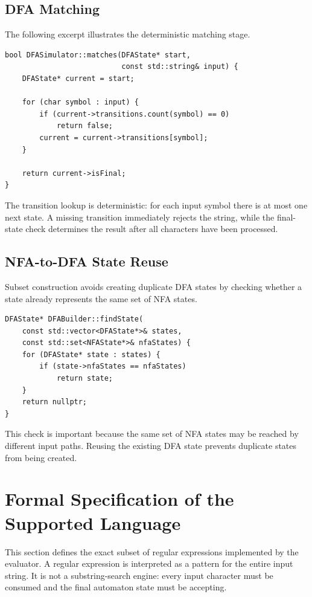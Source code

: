 \documentclass[12pt,a4paper]{report}
\begin{document}
\subsection{DFA Matching}
The following excerpt illustrates the deterministic matching stage.
\begin{lstlisting}
bool DFASimulator::matches(DFAState* start,
                           const std::string& input) {
    DFAState* current = start;

    for (char symbol : input) {
        if (current->transitions.count(symbol) == 0)
            return false;
        current = current->transitions[symbol];
    }

    return current->isFinal;
}
\end{lstlisting}
The transition lookup is deterministic: for each input symbol there is at most one next state. A missing transition immediately rejects the string, while the final-state check determines the result after all characters have been processed.

\subsection{NFA-to-DFA State Reuse}
Subset construction avoids creating duplicate DFA states by checking whether a state already represents the same set of NFA states.
\begin{lstlisting}
DFAState* DFABuilder::findState(
    const std::vector<DFAState*>& states,
    const std::set<NFAState*>& nfaStates) {
    for (DFAState* state : states) {
        if (state->nfaStates == nfaStates)
            return state;
    }
    return nullptr;
}
\end{lstlisting}
This check is important because the same set of NFA states may be reached by different input paths. Reusing the existing DFA state prevents duplicate states from being created.

\section{Formal Specification of the Supported Language}
This section defines the exact subset of regular expressions implemented by the evaluator. A regular expression is interpreted as a pattern for the entire input string. It is not a substring-search engine: every input character must be consumed and the final automaton state must be accepting.
\end{document}
